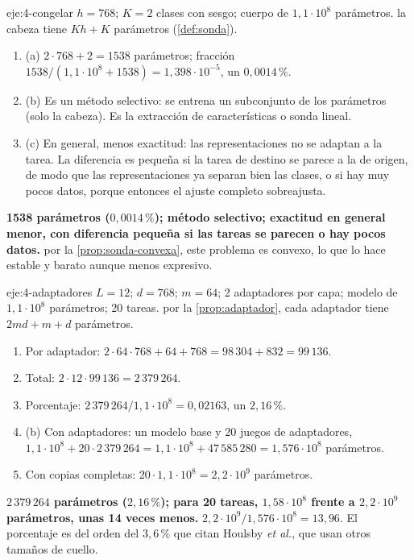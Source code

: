 \begin{solucion}{eje:4-congelar}
\datos $h=768$; $K=2$ clases con sesgo; cuerpo de $1{,}1\cdot 10^{8}$ parámetros.
\planteamiento la cabeza tiene $Kh+K$ parámetros (\cref{def:sonda}).
\pasos
\begin{enumerate}[label=\arabic*.]
  \item (a) $2\cdot 768+2=1538$ parámetros; fracción $1538/(1{,}1\cdot 10^{8}+1538)=1{,}398\cdot 10^{-5}$, un $0{,}0014\,\%$.
  \item (b) Es un método selectivo: se entrena un subconjunto de los parámetros (solo la cabeza). Es la extracción de características o sonda lineal.
  \item (c) En general, menos exactitud: las representaciones no se adaptan a la tarea. La diferencia es pequeña si la tarea de destino se parece a la de origen, de modo que las representaciones ya separan bien las clases, o si hay muy pocos datos, porque entonces el ajuste completo sobreajusta.
\end{enumerate}
\resultado \textbf{1538 parámetros ($0{,}0014\,\%$); método selectivo; exactitud en general menor, con diferencia pequeña si las tareas se parecen o hay pocos datos.}
\comprobacion por la \cref{prop:sonda-convexa}, este problema es convexo, lo que lo hace estable y barato aunque menos expresivo.
\end{solucion}

\begin{solucion}{eje:4-adaptadores}
\datos $L=12$; $d=768$; $m=64$; 2 adaptadores por capa; modelo de $1{,}1\cdot 10^{8}$ parámetros; 20 tareas.
\planteamiento por la \cref{prop:adaptador}, cada adaptador tiene $2md+m+d$ parámetros.
\pasos
\begin{enumerate}[label=\arabic*.]
  \item Por adaptador: $2\cdot 64\cdot 768+64+768=98\,304+832=99\,136$.
  \item Total: $2\cdot 12\cdot 99\,136=2\,379\,264$.
  \item Porcentaje: $2\,379\,264/1{,}1\cdot 10^{8}=0{,}02163$, un $2{,}16\,\%$.
  \item (b) Con adaptadores: un modelo base y 20 juegos de adaptadores, $1{,}1\cdot 10^{8}+20\cdot 2\,379\,264=1{,}1\cdot 10^{8}+47\,585\,280=1{,}576\cdot 10^{8}$ parámetros.
  \item Con copias completas: $20\cdot 1{,}1\cdot 10^{8}=2{,}2\cdot 10^{9}$ parámetros.
\end{enumerate}
\resultado \textbf{$2\,379\,264$ parámetros ($2{,}16\,\%$); para 20 tareas, $1{,}58\cdot 10^{8}$ frente a $2{,}2\cdot 10^{9}$ parámetros, unas 14 veces menos.}
\comprobacion $2{,}2\cdot 10^{9}/1{,}576\cdot 10^{8}=13{,}96$. El porcentaje es del orden del $3{,}6\,\%$ que citan Houlsby \emph{et al.}, que usan otros tamaños de cuello.
\end{solucion}

